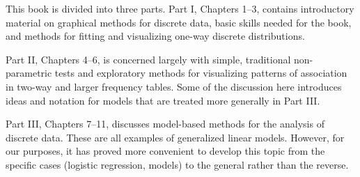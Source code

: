 
This book is divided into three parts. Part I, Chapters 1--3, contains 
introductory material on graphical methods for discrete data, 
basic \R skills needed for the book, and methods for fitting
and visualizing one-way discrete distributions.

Part II, Chapters 4--6, is concerned largely with 
simple, traditional non-parametric tests and exploratory methods for
visualizing patterns of association in two-way and larger frequency tables.
Some of the discussion here introduces ideas and notation for \loglin
models that are treated more generally in Part III.

Part III, Chapters 7--11, discusses model-based methods for the
analysis of discrete data.  These are all examples of generalized
linear models.  However, for our purposes, it has proved more convenient
to develop this topic from the specific cases (logistic regression, \loglin models)
to the general rather than the reverse.

